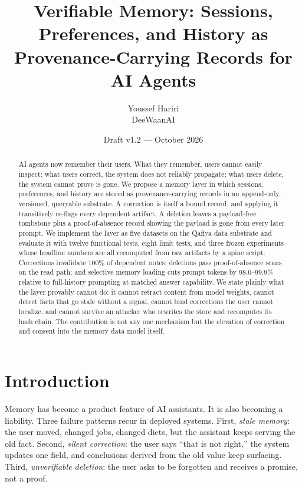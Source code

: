 \documentclass[11pt]{article}
\title{\textbf{Verifiable Memory: Sessions, Preferences, and History as\\ Provenance-Carrying Records for AI Agents}}
\author{Youssef Hariri\\ DeeWaanAI}
\date{Draft v1.2 --- October 2026}
\begin{document}
\maketitle

\begin{abstract}
\noindent AI agents now remember their users. What they remember, users cannot easily inspect; what users correct, the system does not reliably propagate; what users delete, the system cannot prove is gone. We propose a memory layer in which sessions, preferences, and history are stored as provenance-carrying records in an append-only, versioned, queryable substrate. A correction is itself a bound record, and applying it transitively re-flags every dependent artifact. A deletion leaves a payload-free tombstone plus a proof-of-absence record showing the payload is gone from every later prompt. We implement the layer as five datasets on the Qafiya data substrate and evaluate it with twelve functional tests, eight limit tests, and three frozen experiments whose headline numbers are all recomputed from raw artifacts by a spine script. Corrections invalidate 100\% of dependent notes; deletions pass proof-of-absence scans on the read path; and selective memory loading cuts prompt tokens by 98.0--99.9\% relative to full-history prompting at matched answer capability. We state plainly what the layer provably cannot do: it cannot retract content from model weights, cannot detect facts that go stale without a signal, cannot bind corrections the user cannot localize, and cannot survive an attacker who rewrites the store and recomputes its hash chain. The contribution is not any one mechanism but the elevation of correction and consent into the memory data model itself.
\end{abstract}

\section{Introduction}
Memory has become a product feature of AI assistants. It is also becoming a liability. Three failure patterns recur in deployed systems. First, \emph{stale memory}: the user moved, changed jobs, changed diets, but the assistant keeps serving the old fact. Second, \emph{silent correction}: the user says ``that is not right,'' the system updates one field, and conclusions derived from the old value keep surfacing. Third, \emph{unverifiable deletion}: the user asks to be forgotten and receives a promise, not a proof.
\end{document}
